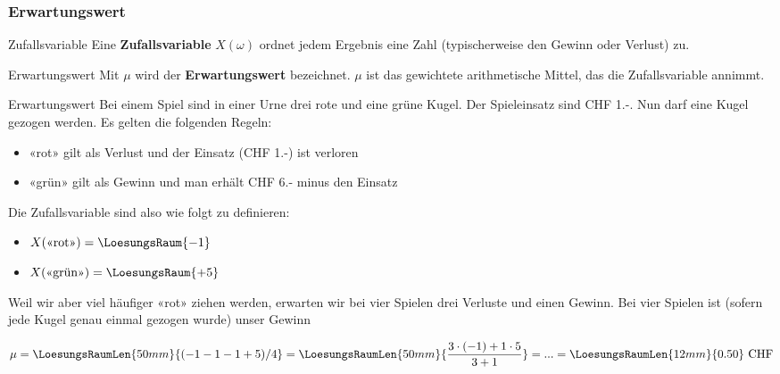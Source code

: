 
\subsubsection{Erwartungswert}

\begin{definition}{Zufallsvariable}{}
	Eine \textbf{Zufallsvariable} $X(\omega)$ ordnet jedem Ergebnis eine Zahl
	(typischerweise den Gewinn oder Verlust) zu.
\end{definition}


\begin{definition}{Erwartungswert}{}
	Mit $\mu$ wird der \textbf{Erwartungswert} bezeichnet.
	$\mu$ ist das gewichtete arithmetische Mittel, das die Zufallsvariable
	annimmt.
\end{definition}



\begin{beispiel}{Erwartungswert}{}
  Bei einem Spiel sind in einer Urne drei rote und eine grüne
  Kugel. Der Spieleinsatz sind CHF 1.-. Nun darf eine Kugel gezogen
  werden. Es gelten die folgenden Regeln:
  \begin{itemize}
  \item «rot» gilt als Verlust und der Einsatz (CHF 1.-) ist verloren
  \item «grün» gilt als Gewinn und man erhält CHF 6.- minus den Einsatz
  \end{itemize}
  Die Zufallsvariable sind also wie folgt zu definieren:
  \begin{itemize}
  \item $X(\text{«rot»}) = \LoesungsRaum{-1}$
  \item $X(\text{«grün»}) = \LoesungsRaum{+5}$
  \end{itemize}

  Weil wir aber viel häufiger «rot» ziehen werden, erwarten wir bei
  vier Spielen drei Verluste und einen Gewinn. Bei vier Spielen ist
  (sofern jede Kugel genau einmal gezogen wurde) unser Gewinn

  $$ \mu = \LoesungsRaumLen{50mm}{( -1 -1 -1 + 5) / 4} = \LoesungsRaumLen{50mm}{\frac{3\cdot{}(-1) + 1\cdot{}5}{3+1}}
  = ... = \LoesungsRaumLen{12mm}{0.50} \text{ CHF}$$
\end{beispiel}

